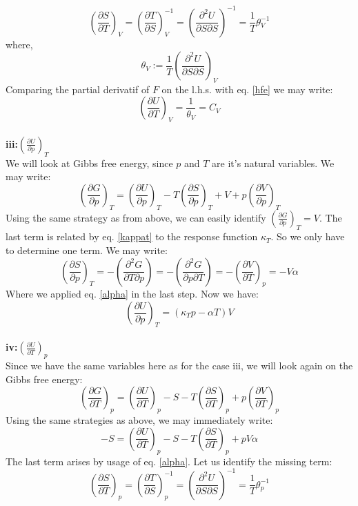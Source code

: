 \documentclass[a4paper]{article}
\newcommand{\pd}[3]{\left(\frac{\partial {#1}}{\partial {#2}}\right)_{#3}}
\newcommand{\pdd}[3]{\left(\frac{\partial^2 {#1}}{\partial {#2}\partial {#3}}\right)}
\begin{document}
\begin{equation}
    \pd{S}{T}{V}=\pd{T}{S}{V}^{-1}=\pdd{U}{S}{S}^{-1}=\frac{1}{T}\theta_V^{-1}
\end{equation}
where,
\begin{equation}
    \theta_V:=\frac{1}{T}\pdd{U}{S}{S}_V
\end{equation}
Comparing the partial derivatif of $F$ on the l.h.s. with eq. \ref{hfe} we may write:
\begin{equation}
    \pd{U}{T}{V}=\frac{1}{\theta_V}=C_V \label{pdutv}
\end{equation}
\\${}$\\
\textbf{iii:}$\pd{U}{p}{T}$
\\${}$\\
We will look at Gibbs free energy, since $p$ and $T$ are it's natural variables. We may write:
\begin{equation}
    \pd{G}{p}{T}=\pd{U}{p}{T}-T\pd{S}{p}{T}+V+p\pd{V}{p}{T}
\end{equation}
Using the same strategy as from above, we can easily identify $\pd{G}{p}{T}=V$. The last term is related by eq. \ref{kappat} to the response function $\kappa_T$. So we only have to determine one term. We may write:
\begin{equation}
    \pd{S}{p}{T}=-\pdd{G}{T}{p}=-\pdd{G}{p}{T}=-\pd{V}{T}{p}=-V\alpha
\end{equation}
Where we applied eq. \ref{alpha} in the last step. Now we have:
\begin{equation}
    \pd{U}{p}{T}=(\kappa_Tp-\alpha T)V \label{pdupt}
\end{equation}
\\${}$\\
\textbf{iv:}$\pd{U}{T}{p}$
\\${}$\\
Since we have the same variables here as for the case iii, we will look again on the Gibbs free energy:
\begin{equation}
    \pd{G}{T}{p}=\pd{U}{T}{p}-S-T\pd{S}{T}{p}+p\pd{V}{T}{p}
\end{equation}
Using the same strategies as above, we may immediately write:
\begin{equation}
    -S=\pd{U}{T}{p}-S-T\pd{S}{T}{p}+pV\alpha
\end{equation}
The last term arises by usage of eq. \ref{alpha}. Let us identify the missing term:
\begin{equation}
    \pd{S}{T}{p}=\pd{T}{S}{p}^{-1}=\pdd{U}{S}{S}^{-1}=\frac{1}{T}\theta_p^{-1}
\end{equation}
\end{document}
